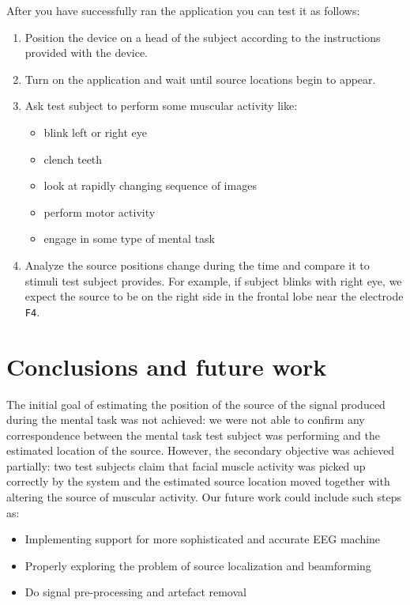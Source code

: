\documentclass[twocolumn]{article}
\begin{document}
After you have successfully ran the application you can test it as follows:
\begin{enumerate}
	\item 	Position the device on a head of the subject according to the instructions provided with the device.
	\item Turn on the application and wait until source locations begin to appear.
	\item Ask test subject to perform some muscular activity like:
		\begin{itemize}
			\item blink left or right eye
			\item clench teeth
			\item look at rapidly changing sequence of images
			\item perform motor activity
			\item engage in some type of mental task
		\end{itemize}
	\item Analyze the source positions change during the time and compare it to stimuli test subject provides. For example, if subject blinks with right eye, we expect the source to be on the right side in the frontal lobe near the electrode \texttt{F4}.
\end{enumerate}


%
%
\section*{Conclusions and future work}
The initial goal of estimating the position of the source of the signal produced during the mental task was not achieved: we were not able to confirm any correspondence between the mental task test subject was performing and the estimated location of the source. However, the secondary objective was achieved partially: two test subjects claim that facial muscle activity was picked up correctly by the system and the estimated source location moved together with altering the source of muscular activity. Our future work could include such steps as:
\begin{itemize}
	\item Implementing support for more sophisticated and accurate EEG machine
	\item Properly exploring the problem of source localization and beamforming
	\item Do signal pre-processing and artefact removal
\end{itemize}
%
%


 
\end{document}
